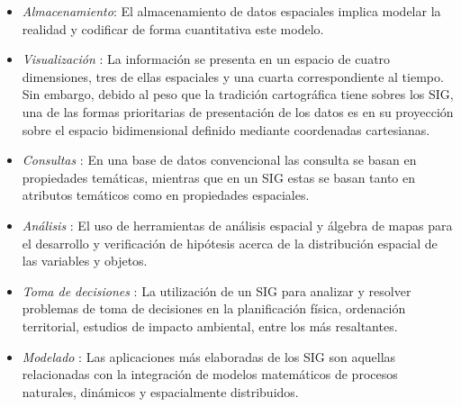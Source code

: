 \begin{itemize}
    \item \textit{Almacenamiento}: El almacenamiento de datos espaciales implica modelar la
    realidad y codificar de forma cuantitativa este modelo.

    \item \textit{Visualización} : La información se presenta en un espacio de cuatro dimensiones,
    tres de ellas espaciales y una cuarta correspondiente al tiempo. Sin embargo, debido al peso
    que la tradición cartográfica tiene sobres los SIG, una de las formas prioritarias de
    presentación de los datos es en su proyección sobre el espacio bidimensional definido mediante
    coordenadas cartesianas.

    \item \textit{Consultas} : En una base de datos convencional las consulta se basan en
    propiedades temáticas, mientras que en un SIG estas se basan tanto en atributos temáticos como
    en propiedades espaciales.

    \item \textit{Análisis} : El uso de herramientas de análisis espacial y álgebra de mapas para
    el desarrollo y verificación de hipótesis acerca de la distribución espacial de las variables
    y objetos.

    \item \textit{Toma de decisiones} : La utilización de un SIG para analizar y resolver
    problemas de toma de decisiones en la planificación física, ordenación territorial, estudios
    de impacto ambiental, entre los más resaltantes.

    \item \textit{Modelado} : Las aplicaciones más elaboradas de los SIG son aquellas
    relacionadas con la integración de modelos matemáticos de procesos naturales, dinámicos y
    espacialmente distribuidos.
\end{itemize}
